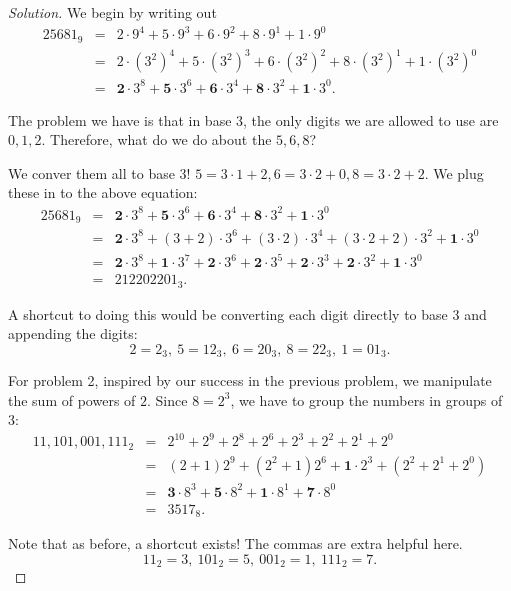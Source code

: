 \begin{proof}[Solution] 
We begin by writing out \begin{eqnarray*} 25681_9&=&2\cdot 9^4+5\cdot 9^3+6\cdot 9^2+8\cdot 9^1+1\cdot 9^0 \\ &=& 2\cdot \left(3^2\right)^4+5\cdot \left(3^2\right)^3+6\cdot \left(3^2\right)^2+8\cdot \left(3^2\right)^1+1\cdot \left(3^2\right)^0 \\ &=& \textbf{2}\cdot 3^8+\textbf{5}\cdot 3^6+\textbf{6}\cdot 3^4+\textbf{8}\cdot 3^2+\textbf{1}\cdot 3^0. \end{eqnarray*}

The problem we have is that in base 3, the only digits we are allowed to use are $0, 1, 2$. Therefore, what do we do about the $5, 6, 8$?  

\clearpage

We conver them all to base 3! $5=3\cdot 1+2, 6=3\cdot 2+0, 8=3\cdot 2+2$. We plug these in to the above equation: 
\begin{eqnarray*}
 25681_9 &=& \textbf{2}\cdot 3^8+\textbf{5}\cdot 3^6+\textbf{6}\cdot 3^4+\textbf{8}\cdot 3^2+\textbf{1}\cdot 3^0 \\ 
	&=& \textbf{2}\cdot 3^8+\left(3+2\right)\cdot 3^6+(3\cdot 2)\cdot 3^4+(3\cdot 2+2)\cdot 3^2+\textbf{1}\cdot 3^0 \\ 
	&=& \textbf{2}\cdot 3^8+\textbf{1}\cdot 3^7+\textbf{2}\cdot 3^6+\textbf{2}\cdot 3^5+\textbf{2}\cdot 3^3+\textbf{2}\cdot 3^2+\textbf{1}\cdot 3^0 \\
	&=& \boxed{212202201_3}.  \end{eqnarray*}

A shortcut to doing this would be converting each digit directly to base $3$ and appending the digits: $$2=2_3,\: 5=12_3,\: 6=20_3,\: 8=22_3,\: 1=01_3.$$ 

\clearpage

For problem 2, inspired by our success in the previous problem, we manipulate the sum of powers of $2$. Since $8=2^3$, we have to group the numbers in groups of $3$: \begin{eqnarray*} 11,101,001,111_2 &=& 2^{10}+2^9+2^8+2^6+2^3+2^2+2^1+2^0 \\ &=& \left(2+1\right)2^9+\left(2^2+1\right)2^6+\textbf{1}\cdot 2^3+\left(2^2+2^1+2^0\right) \\ &=& \textbf{3}\cdot 8^3+\textbf{5}\cdot 8^2+\textbf{1}\cdot 8^1+\textbf{7}\cdot 8^0 \\ &=& \boxed{3517_8}. \end{eqnarray*}

Note that as before, a shortcut exists! The commas are extra helpful here. $$11_2=3,\: 101_2=5,\: 001_2=1,\: 111_2=7.$$   \end{proof}
\clearpage

